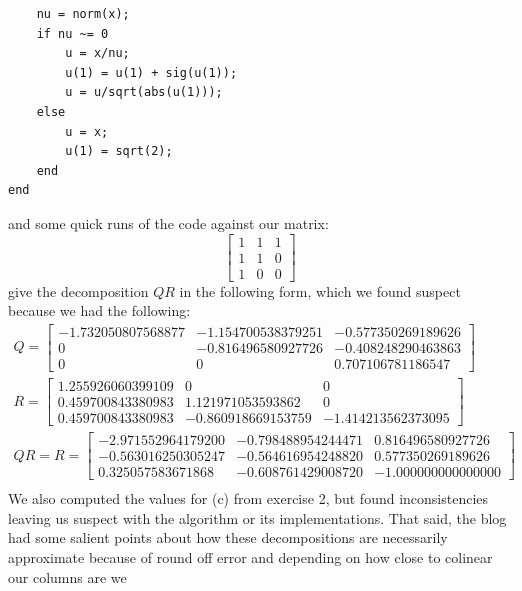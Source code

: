 \documentclass[12pt]{amsart}
\begin{document}
\begin{onehalfspace}
\begin{tiny}
\begin{verbatim}
    nu = norm(x);
    if nu ~= 0
        u = x/nu;
        u(1) = u(1) + sig(u(1));
        u = u/sqrt(abs(u(1)));
    else
        u = x;
        u(1) = sqrt(2);
    end
end
        \end{verbatim}
        \end{tiny}
        and some quick runs of the code against our matrix:
        \begin{displaymath}
            \left[\begin{matrix}
                1 & 1 & 1 \\
                1 & 1 & 0 \\
                1 & 0 & 0
            \end{matrix}\right]
        \end{displaymath}
        give the decomposition $QR$ in the following form, which we found suspect because we had the following:
        \begin{gather*}
            Q  =  \left[\begin{matrix}
                            -1.732050807568877 &  -1.154700538379251  & -0.577350269189626\\
                             0 & -0.816496580927726 & -0.408248290463863\\
                             0       &            0  &  0.707106781186547
            \end{matrix}\right]\\
            R  =  \left[\begin{matrix}
                            1.255926060399109  &                 0 &                   0 \\
                            0.459700843380983 & 1.121971053593862  &                0 \\
                            0.459700843380983 & -0.860918669153759 & -1.414213562373095
            \end{matrix}\right]\\
            QR =
            R  =  \left[\begin{matrix}
                           -2.971552964179200 & -0.798488954244471 & 0.816496580927726 \\
                           -0.563016250305247 & -0.564616954248820 & 0.577350269189626\\
                           0.325057583671868 & -0.608761429008720 & -1.000000000000000
            \end{matrix}\right]\\
        \end{gather*}
        We also computed the values for (c) from exercise 2, but found inconsistencies leaving us suspect with the
        algorithm or its implementations.
        That said, the blog had some salient points about how these decompositions are necessarily approximate
        because of round off error and depending on how close to colinear our columns are we


\end{onehalfspace}
\end{document}
